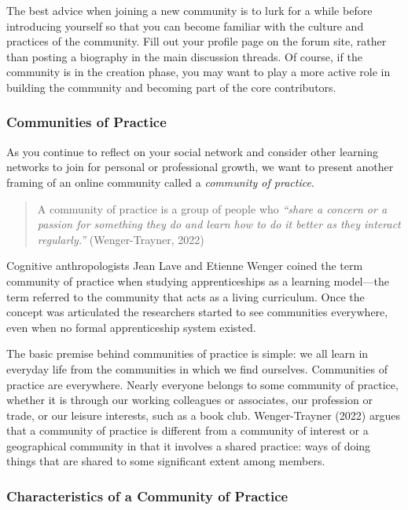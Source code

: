 \documentclass[
  letterpaper,
  DIV=11,
  numbers=noendperiod]{scrreprt}
\begin{document}
The best advice when joining a new community is to lurk for a while
before introducing yourself so that you can become familiar with the
culture and practices of the community. Fill out your profile page on
the forum site, rather than posting a biography in the main discussion
threads. Of course, if the community is in the creation phase, you may
want to play a more active role in building the community and becoming
part of the core contributors.

\subsubsection*{Communities of Practice}\label{communities-of-practice}

As you continue to reflect on your social network and consider other
learning networks to join for personal or professional growth, we want
to present another framing of an online community called a
\emph{community of practice}.

\begin{quote}
A community of practice is a group of people who \emph{``share a concern
or a passion for something they do and learn how to do it better as they
interact regularly.''} (Wenger-Trayner, 2022)
\end{quote}

Cognitive anthropologists Jean Lave and Etienne Wenger coined the term
community of practice when studying apprenticeships as a learning
model---the term referred to the community that acts as a living
curriculum. Once the concept was articulated the researchers started to
see communities everywhere, even when no formal apprenticeship system
existed.

The basic premise behind communities of practice is simple: we all learn
in everyday life from the communities in which we find ourselves.
Communities of practice are everywhere. Nearly everyone belongs to some
community of practice, whether it is through our working colleagues or
associates, our profession or trade, or our leisure interests, such as a
book club. Wenger-Trayner (2022) argues that a community of practice is
different from a community of interest or a geographical community in
that it involves a shared practice: ways of doing things that are shared
to some significant extent among members.

\subsubsection*{Characteristics of a Community of
Practice}\label{characteristics-of-a-community-of-practice}
\end{document}
